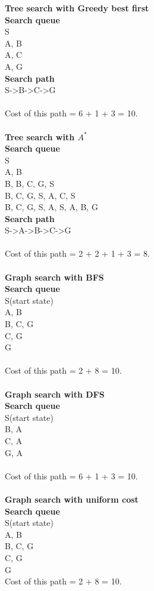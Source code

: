 {\bf Tree search with Greedy best first}\\
{\bf Search queue}\\
S\\
A, B\\
A, C\\
A, G\\
{\bf Search path}\\
S-{\textgreater }B-{\textgreater }C-{\textgreater }G  \\\\
Cost of this path = 6 + 1 + 3 = 10.\\ \\

{\bf Tree search with $A^*$}\\
{\bf Search queue}\\
S\\
A, B\\
B, B, C, G, S\\
B, C, G, S, A, C, S\\
B, C, G, S, A, S, A, B, G\\
{\bf Search path}\\
S-{\textgreater }A-{\textgreater }B-{\textgreater }C-{\textgreater }G  \\\\
Cost of this path = 2 + 2 + 1 + 3 = 8.\\ \\

{\bf Graph search with BFS}\\
{\bf Search queue}\\
S(start state)\\
A, B\\
B, C, G\\
C, G\\
G\\
\\
Cost of this path = 2 + 8 = 10.\\ \\

{\bf Graph search with DFS}\\
{\bf Search queue}\\
S(start state)\\
B, A\\
C, A\\
G, A\\
\\
Cost of this path = 6 + 1 + 3 = 10.\\ \\

{\bf Graph search with uniform cost}\\
{\bf Search queue}\\
S(start state)\\
A, B\\
B, C, G\\
C, G\\
G\\
Cost of this path = 2 + 8 = 10.\\ \\

